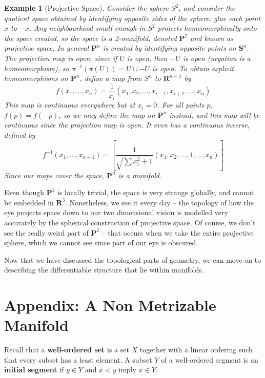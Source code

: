 \documentclass[12pt]{report}
\theoremstyle{plain}
\newtheorem*{example}{Example}
\theoremstyle{definition}
\begin{document}
\begin{example}[Projective Space]
    Consider the sphere $S^2$, and consider the quotient space obtained by identifying opposite sides of the sphere: glue each point $x$ to $-x$. Any neighbourhood small enough in $S^2$ projects homeomorphically onto the space created, so the space is a 2-manifold, denoted $\mathbf{P}^2$ and known as projective space. In general $\mathbf{P}^n$ is created by identifying opposite points on $\mathbf{S}^n$. The projection map is open, since if $U$ is open, then $-U$ is open (negation is a homeomorphism), so $\pi^{-1}(\pi(U)) = U \cup -U$ is open. To obtain explicit homeomorphisms on $\mathbf{P}^n$, define a map from $S^n$ to $\mathbf{R}^{n-1}$ by
    \[ f(x_1, \dots, x_n) = \frac{1}{x_i}(x_1, x_2, \dots, x_{i-1}, x_{i + 1}, \dots, x_n) \]
    This map is continuous everywhere but at $x_i = 0$. For all points $p$, $f(p) = f(-p)$, so we may define the map on $\mathbf{P}^n$ instead, and this map will be continuous since the projection map is open. It even has a continuous inverse, defined by
    \[ f^{-1}(x_1, \dots, x_{n-1}) = \left[ \frac{1}{\sqrt{\sum x_i^2 + 1}} \left(x_1, x_2, \dots, 1, \dots, x_n \right) \right] \]
    Since our maps cover the space, $\mathbf{P}^n$ is a manifold.
\end{example}

Even though $\mathbf{P}^2$ is locally trivial, the space is very strange globally, and cannot be embedded in $\mathbf{R}^3$. Nonetheless, we see it every day -- the topology of how the eye projects space down to our two dimensional vision is modelled very accurately by the spherical construction of projective space. Of course, we don't see the really weird part of $\mathbf{P}^2$ -- that occurs when we take the entire projective sphere, which we cannot see since part of our eye is obscured.

Now that we have discussed the topological parts of geometry, we can move on to describing the differentiable structure that lie within manifolds.

\newpage

\section{Appendix: A Non Metrizable Manifold}

Recall that a {\bf well-ordered set} is a set $X$ together with a linear ordering such that every subset has a least element. A subset $Y$ of a well-ordered segment is an {\bf initial segment} if $y \in Y$ and $x < y$ imply $x \in Y$.
\end{document}
